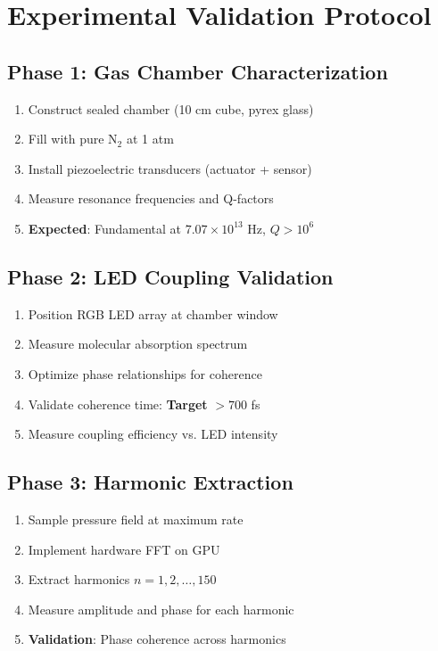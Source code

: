 \documentclass[12pt,a4paper]{article}
\begin{document}
\section{Experimental Validation Protocol}

\subsection{Phase 1: Gas Chamber Characterization}

\begin{enumerate}
\item Construct sealed chamber (10 cm cube, pyrex glass)
\item Fill with pure N$_2$ at 1 atm
\item Install piezoelectric transducers (actuator + sensor)
\item Measure resonance frequencies and Q-factors
\item \textbf{Expected}: Fundamental at $7.07 \times 10^{13}$ Hz, $Q > 10^6$
\end{enumerate}

\subsection{Phase 2: LED Coupling Validation}

\begin{enumerate}
\item Position RGB LED array at chamber window
\item Measure molecular absorption spectrum
\item Optimize phase relationships for coherence
\item Validate coherence time: \textbf{Target} $> 700$ fs
\item Measure coupling efficiency vs. LED intensity
\end{enumerate}

\subsection{Phase 3: Harmonic Extraction}

\begin{enumerate}
\item Sample pressure field at maximum rate
\item Implement hardware FFT on GPU
\item Extract harmonics $n = 1, 2, \ldots, 150$
\item Measure amplitude and phase for each harmonic
\item \textbf{Validation}: Phase coherence across harmonics
\end{enumerate}
\end{document}
